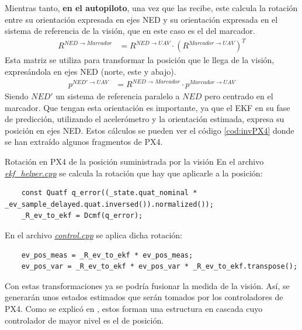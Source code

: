 Mientras tanto, \textbf{en el autopiloto}, una vez que las recibe, este calcula la rotación entre su orientación expresada en ejes NED y su orientación expresada en el sistema de referencia de la visión, que en este caso es el del marcador. 
\begin{align}
R^{NED \rightarrow Marcador}& =  R^{NED \rightarrow UAV} \cdot  \left(R^{Marcador \rightarrow UAV}\right)^T
\end{align}
Esta matriz se utiliza para transformar la posición que le llega de la visión, expresándola en ejes NED (norte, este y abajo).
\begin{align}
p^{NED' \rightarrow UAV}& = R^{NED \rightarrow Marcador} \cdot p^{Marcador \rightarrow UAV}
\end{align}
Siendo $NED'$ un sistema de referencia paralelo a $NED$ pero centrado en el marcador.
Que tengan esta orientación es importante, ya que el EKF en su fase de predicción, utilizando el acelerómetro y la orientación estimada, expresa su posición en ejes NED.
Estos cálculos se pueden ver el código \ref{cod:invPX4} donde se han extraído algunos fragmentos de PX4. 

\begin{codigo}[label=cod:invPX4]{Rotación en PX4 de la posición suministrada por la visión}
En el archivo \href{https://github.com/PX4/PX4-ECL/blob/ec934908900b23ee273d1a9f82364b7b38423200/EKF/ekf\_helper.cpp\#L1460}{\textit{ekf\_helper.cpp}} se calcula la rotación que hay que aplicarle a la posición:
\begin{verbatim}
    const Quatf q_error((_state.quat_nominal * _ev_sample_delayed.quat.inversed()).normalized());
    _R_ev_to_ekf = Dcmf(q_error);
\end{verbatim}
En el archivo \href{https://github.com/PX4/PX4-ECL/blob/ec934908900b23ee273d1a9f82364b7b38423200/EKF/control.cpp\#L273}{\textit{control.cpp}} se aplica dicha rotación:
\begin{verbatim}
    ev_pos_meas = _R_ev_to_ekf * ev_pos_meas;
    ev_pos_var = _R_ev_to_ekf * ev_pos_var * _R_ev_to_ekf.transpose();
\end{verbatim}
\end{codigo} 

Con estas transformaciones ya se podría fusionar la medida de la visión. Así, se generarán unos estados estimados que serán tomados por los controladores de PX4. Como se explicó en \cite{arias2019control}, estos forman una estructura en cascada cuyo controlador de mayor nivel es el de posición. 


